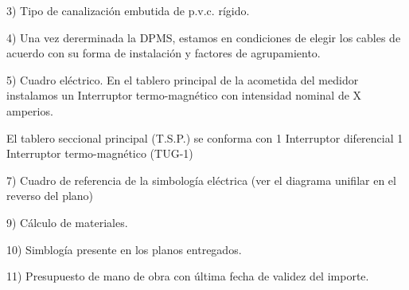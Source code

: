 3) Tipo de canalización embutida de p.v.c. rígido.

4) Una vez dererminada la DPMS, estamos en condiciones de elegir los cables de acuerdo
con su forma de instalación y factores de agrupamiento.

5) Cuadro eléctrico. 
En el tablero principal de la acometida del medidor instalamos un
Interruptor termo-magnético con intensidad nominal de X amperios.

El tablero seccional principal (T.S.P.) se conforma con
1 Interruptor diferencial
1 Interruptor termo-magnético (TUG-1)

7) Cuadro de referencia de la simbología eléctrica (ver el diagrama unifilar en el reverso del plano)


9) Cálculo de materiales.

10) Simblogía presente en los planos entregados.

11) Presupuesto de mano de obra con última fecha de validez del importe.






